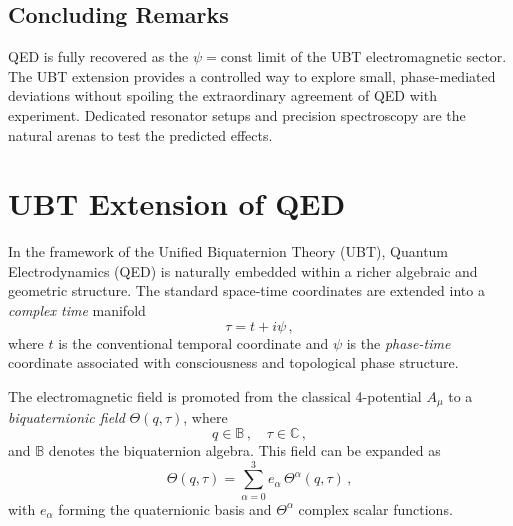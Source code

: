 \subsection*{Concluding Remarks}
QED is fully recovered as the $\psi=\mathrm{const}$ limit of the UBT electromagnetic sector. The UBT extension provides a controlled way to explore small, phase-mediated deviations without spoiling the extraordinary agreement of QED with experiment. Dedicated resonator setups and precision spectroscopy are the natural arenas to test the predicted effects.

\section{UBT Extension of QED}

In the framework of the Unified Biquaternion Theory (UBT), Quantum Electrodynamics (QED) is naturally embedded within a richer algebraic and geometric structure. The standard space-time coordinates are extended into a \emph{complex time} manifold
\begin{equation}
\tau = t + i \psi \,,
\end{equation}
where \(t\) is the conventional temporal coordinate and \(\psi\) is the \emph{phase-time} coordinate associated with consciousness and topological phase structure.  

The electromagnetic field is promoted from the classical 4-potential \(A_\mu\) to a \emph{biquaternionic field} \(\Theta(q,\tau)\), where
\begin{equation}
q \in \mathbb{B} \,, \quad \tau \in \mathbb{C} \,,
\end{equation}
and \(\mathbb{B}\) denotes the biquaternion algebra. This field can be expanded as
\begin{equation}
\Theta(q,\tau) = \sum_{\alpha=0}^3 e_\alpha \, \Theta^\alpha(q,\tau) \,,
\end{equation}
with \(e_\alpha\) forming the quaternionic basis and \(\Theta^\alpha\) complex scalar functions.

